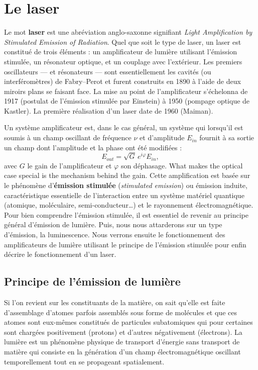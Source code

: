 \section{Le laser}
Le mot \textbf{laser} est une abréviation anglo-saxonne signifiant
\textit{Light Amplification by Stimulated Emission of Radiation}. Quel que soit
le type de laser, un laser est constitué de trois éléments : un amplificateur de
lumière utilisant l'émission stimulée, un résonateur optique, et un couplage
avec l'extérieur. Les premiers oscillateurs --- et résonateurs --- sont
essentiellement les cavités (ou interféromètres) de Fabry--Perot et furent
construits en 1890 à l'aide de deux miroirs plans se faisant face. La mise au
point de l'amplificateur s'échelonna de 1917 (postulat de l'émission stimulée
par Einstein) à 1950 (pompage optique de Kastler). La première réalisation d'un
laser date de 1960 (Maiman).

Un système amplificateur est, dans le cas général, un système qui lorsqu'il est
soumis à un champ oscillant de fréquence $\nu$ et d'amplitude $E_{in}$ fournit
à sa sortie un champ dont l'amplitude et la phase ont été modifiées :
\[E_{out}=\sqrt{G}\,e^{i\varphi}E_{in},\]
avec $G$ le gain de l'amplificateur et $\varphi$ son déphasage. What makes the
optical case special is the mechanism behind the gain. Cette amplification est
basée sur le phénomène d'\textbf{émission stimulée} (\textit{stimulated
emission}) ou émission induite, caractéristique essentielle de l'interaction
entre un système matériel quantique (atomique, moléculaire, semi-conducteur…) et
le rayonnement électromagnétique. Pour bien comprendre l'émission stimulée, il
est essentiel de revenir au principe général d'émission de lumière. Puis, nous
nous attarderons sur un type d'émission, la luminescence. Nous verrons ensuite
le fonctionnement des amplificateurs de lumière utilisant le principe de
l'émission stimulée pour enfin décrire le fonctionnement d'un laser.

\subsection{Principe de l'émission de lumière}
Si l'on revient sur les constituants de la matière, on sait qu'elle est faite
d'assemblage d'atomes parfois assemblés sous forme de molécules et que ces
atomes sont eux-mêmes constitués de particules subatomiques qui pour certaines
sont chargées positivement (protons) et d'autres négativement (électrons). La
lumière est un phénomène physique de transport d'énergie sans transport de
matière qui consiste en la génération d'un champ électromagnétique oscillant
temporellement tout en se propageant spatialement.

